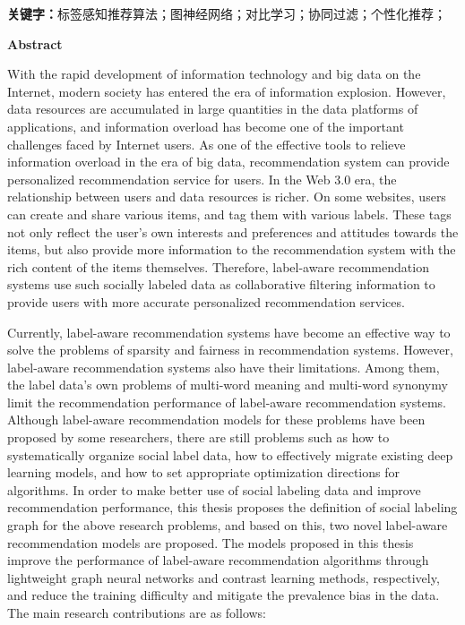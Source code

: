 \vspace{20pt}
\noindent \textbf{关键字：}标签感知推荐算法；图神经网络；对比学习；协同过滤；个性化推荐；

\clearpage
{}
\begin{center}
    \textbf{ Abstract}
\end{center}

With the rapid development of information technology and big data on the Internet, modern society has entered the era of information explosion. However, data resources are accumulated in large quantities in the data platforms of applications, and information overload has become one of the important challenges faced by Internet users. As one of the effective tools to relieve information overload in the era of big data, recommendation system can provide personalized recommendation service for users. In the Web 3.0 era, the relationship between users and data resources is richer. On some websites, users can create and share various items, and tag them with various labels. These tags not only reflect the user's own interests and preferences and attitudes towards the items, but also provide more information to the recommendation system with the rich content of the items themselves. Therefore, label-aware recommendation systems use such socially labeled data as collaborative filtering information to provide users with more accurate personalized recommendation services.

Currently, label-aware recommendation systems have become an effective way to solve the problems of sparsity and fairness in recommendation systems. However, label-aware recommendation systems also have their limitations. Among them, the label data's own problems of multi-word meaning and multi-word synonymy limit the recommendation performance of label-aware recommendation systems. Although label-aware recommendation models for these problems have been proposed by some researchers, there are still problems such as how to systematically organize social label data, how to effectively migrate existing deep learning models, and how to set appropriate optimization directions for algorithms. In order to make better use of social labeling data and improve recommendation performance, this thesis proposes the definition of social labeling graph for the above research problems, and based on this, two novel label-aware recommendation models are proposed. The models proposed in this thesis improve the performance of label-aware recommendation algorithms through lightweight graph neural networks and contrast learning methods, respectively, and reduce the training difficulty and mitigate the prevalence bias in the data. The main research contributions are as follows:

